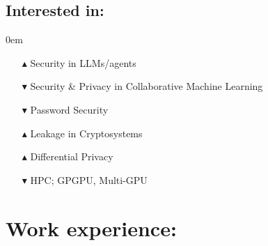 \documentclass[margin, 10pt]{article} %
\begin{document}
 
 

\subsection*{Interested in:} 
\itemsep0em 
\begin{itemize}
\itemsep0em 


\item[$\blacktriangle$] Security in LLMs/agents \cite{nes, llmmap, hackai}
\item[$\blacktriangledown$] {Security \& Privacy in Collaborative Machine Learning} \cite{dl, CCS21, CCS22}  		
\item[$\blacktriangledown$] Password Security \cite{uncm, SP21, adam}
\item[$\blacktriangle$] Leakage in Cryptosystems \cite{MIGP, CCS22} 
\item[$\blacktriangle$] Differential Privacy \cite{uncm}
\item[$\blacktriangledown$] 
 HPC; GPGPU, Multi-GPU \cite{MONOAMG}
\end{itemize}

\noindent\makebox[\linewidth]{\rule{.8\paperwidth}{0.3pt}}


\section*{Work experience:} 
\end{document}
